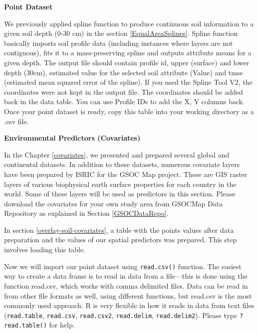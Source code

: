 \documentclass[10pt,b5paper,]{book}
\newenvironment{Shaded}{\begin{snugshade}}{\end{snugshade}}
\newcommand{\CommentTok}[1]{\textcolor[rgb]{0.56,0.35,0.01}{\textit{#1}}}
\newcommand{\KeywordTok}[1]{\textcolor[rgb]{0.13,0.29,0.53}{\textbf{#1}}}
\newcommand{\NormalTok}[1]{#1}
\newcommand{\OperatorTok}[1]{\textcolor[rgb]{0.81,0.36,0.00}{\textbf{#1}}}
\newcommand{\StringTok}[1]{\textcolor[rgb]{0.31,0.60,0.02}{#1}}
\theoremstyle{definition}
\theoremstyle{definition}
\theoremstyle{definition}
\theoremstyle{remark}
\begin{document}
\textbf{Point Dataset}

We previously applied spline function to produce continuous soil
information to a given soil depth (0-30 cm) in the section
\ref{EqualAreaSplines}. Spline function basically imports soil profile
data (including instances where layers are not contiguous), fits it to a
mass-preserving spline and outputs attribute means for a given depth.
The output file should contain profile id, upper (surface) and lower
depth (30cm), estimated value for the selected soil attribute (Value)
and tmse (estimated mean squared error of the spline). If you used the
Spline Tool V2, the coordinates were not kept in the output file. The
coordinates should be added back in the data table. You can use Profile
IDs to add the X, Y columns back. Once your point dataset is ready, copy
this table into your working directory as a .csv file.

\textbf{Environmental Predictors (Covariates)}

In the Chapter \ref{covariates}, we presented and prepared several
global and continental datasets. In addition to these datasets, numerous
covariate layers have been prepared by ISRIC for the GSOC Map project.
These are GIS raster layers of various biophysical earth surface
properties for each country in the world. Some of these layers will be
used as predictors in this section. Please download the covariates for
your own study area from GSOCMap Data Repository as explained in Section
\ref{GSOCDataRepo}.

In section \ref{overlay-soil-covariates}, a table with the points values
after data preparation and the values of our spatial predictors was
prepared. This step involves loading this table.

Now we will import our point dataset using \texttt{read.csv()} function.
The easiest way to create a data frame is to read in data from a
file---this is done using the function read.csv, which works with comma
delimited files. Data can be read in from other file formats as well,
using different functions, but read.csv is the most commonly used
approach. R is very flexible in how it reads in data from text files
(\texttt{read.table}, \texttt{read.csv}, \texttt{read.csv2},
\texttt{read.delim}, \texttt{read.delim2}). Please type
\texttt{?read.table()} for help.

\begin{Shaded}
\end{Shaded}
\end{document}
